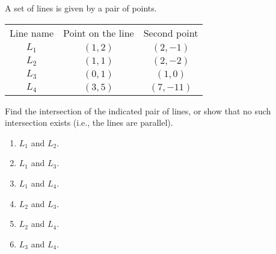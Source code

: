 A set of lines is given by a pair of points.
\begin{tabular}{ccc}
Line name& Point on the line& Second point \\
$L_1$& $(1,2)$ & $(2,-1)$\\
$L_2$& $(1,1)$ & $(2,-2)$\\
$L_3$& $(0,1)$ & $(1,0)$\\
$L_4$& $(3,5)$ & $(7,-11)$\\
\end{tabular}

Find the intersection of the indicated pair of lines, or show that no such intersection exists (i.e., the lines are parallel).

\begin{enumerate}[ref={\fcProblemRef}]
\item $L_1$ and $L_2$.
\item $L_1$ and $L_3$.
\item $L_1$ and $L_4$.
\item $L_2$ and $L_3$. 
\item $L_2$ and $L_4$.
\item $L_3$ and $L_4$.
\end{enumerate}